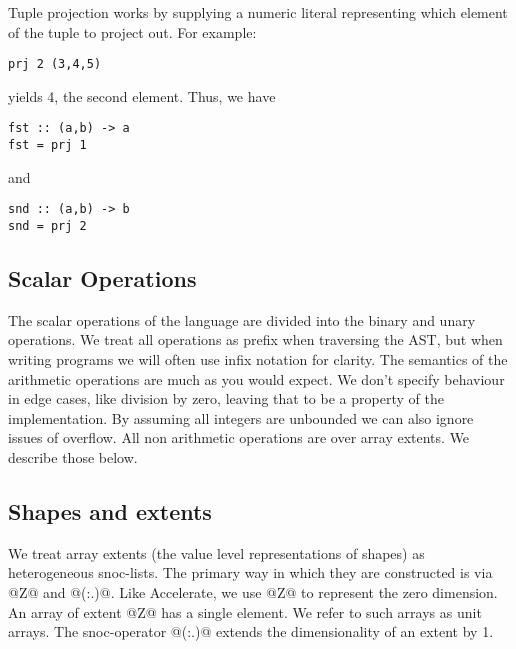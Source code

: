 
Tuple projection works by supplying a numeric literal representing which element of the tuple to project out. For example:
%
\begin{lstlisting}
prj 2 (3,4,5)
\end{lstlisting}
%
yields 4, the second element. Thus, we have
%
\begin{lstlisting}
fst :: (a,b) -> a
fst = prj 1
\end{lstlisting}
%
and
%
\begin{lstlisting}
snd :: (a,b) -> b
snd = prj 2
\end{lstlisting}

\subsection{Scalar Operations}
The scalar operations of the language are divided into the binary and unary operations. We treat all operations as prefix when traversing the AST, but when writing programs we will often use infix notation for clarity. The semantics of the arithmetic operations are much as you would expect. We don't specify behaviour in edge cases, like division by zero, leaving that to be a property of the implementation. By assuming all integers are unbounded we can also ignore issues of overflow. All non arithmetic operations are over array extents. We describe those below.

\subsection{Shapes and extents}
We treat array extents (the value level representations of shapes) as heterogeneous snoc-lists. The primary way in which they are constructed is via @Z@ and @(:.)@. Like Accelerate, we use @Z@ to represent the zero dimension. An array of extent @Z@ has a single element. We refer to such arrays as unit arrays. The snoc-operator @(:.)@ extends the dimensionality of an extent by 1.


